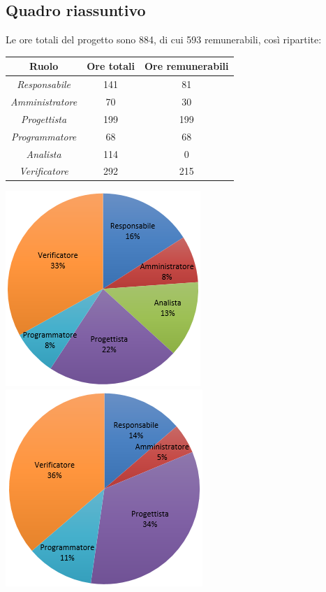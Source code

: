 \subsection{Quadro riassuntivo}
Le ore totali del progetto sono 884, di cui 593 remunerabili, così ripartite:
\begin{center}
  \centering
  \begin{tabular}{|c|c|c|}
    \hline
    \textbf{Ruolo} & \textbf{Ore totali} & \textbf{Ore remunerabili} \\
    \hline
     \emph{Responsabile}  & 141 & 81 \\
    \hline  \emph{Amministratore}  & 70 & 30 \\
    \hline  \emph{Progettista}  & 199 & 199 \\
    \hline  \emph{Programmatore}  & 68 & 68 \\
    \hline  \emph{Analista}  & 114 & 0 \\
    \hline  \emph{Verificatore}  & 292 & 215 \\
    \hline
  \end{tabular}
  \includegraphics[scale=0.7]{img/grafico7.png}
  \includegraphics[scale=0.7]{img/grafico8.png}
\end{center}

